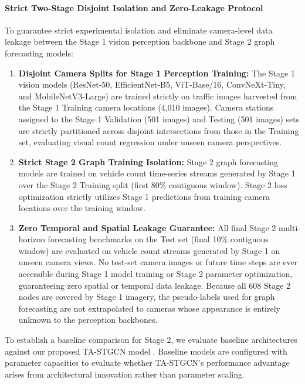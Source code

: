 \documentclass[a4paper,fleqn]{cas-sc}
\begin{document}
\paragraph{Strict Two-Stage Disjoint Isolation and Zero-Leakage Protocol}
To guarantee strict experimental isolation and eliminate camera-level data leakage between the Stage 1 vision perception backbone and Stage 2 graph forecasting models:
\begin{enumerate}
    \item \textbf{Disjoint Camera Splits for Stage 1 Perception Training:} The Stage 1 vision models (ResNet-50, EfficientNet-B5, ViT-Base/16, ConvNeXt-Tiny, and MobileNetV3-Large) are trained strictly on traffic images harvested from the Stage 1 Training camera locations (4,010 images). Camera stations assigned to the Stage 1 Validation (501 images) and Testing (501 images) sets are strictly partitioned across disjoint intersections from those in the Training set, evaluating visual count regression under unseen camera perspectives.
    \item \textbf{Strict Stage 2 Graph Training Isolation:} Stage 2 graph forecasting models are trained on vehicle count time-series streams generated by Stage 1 over the Stage 2 Training split (first 80\% contiguous window). Stage 2 loss optimization strictly utilizes Stage 1 predictions from training camera locations over the training window.
    \item \textbf{Zero Temporal and Spatial Leakage Guarantee:} All final Stage 2 multi-horizon forecasting benchmarks on the Test set (final 10\% contiguous window) are evaluated on vehicle count streams generated by Stage 1 on unseen camera views. No test-set camera images or future time steps are ever accessible during Stage 1 model training or Stage 2 parameter optimization, guaranteeing zero spatial or temporal data leakage. Because all 608 Stage 2 nodes are covered by Stage 1 imagery, the pseudo-labels used for graph forecasting are not extrapolated to cameras whose appearance is entirely unknown to the perception backbones.
\end{enumerate}

\label{sec:experiments}

\label{sec:baselines_config}

To establish a baseline comparison for Stage 2, we evaluate baseline architectures against our proposed TA-STGCN model \cite{stgcn, attention}. Baseline models are configured with parameter capacities to evaluate whether TA-STGCN's performance advantage arises from architectural innovation rather than parameter scaling.
\end{document}

